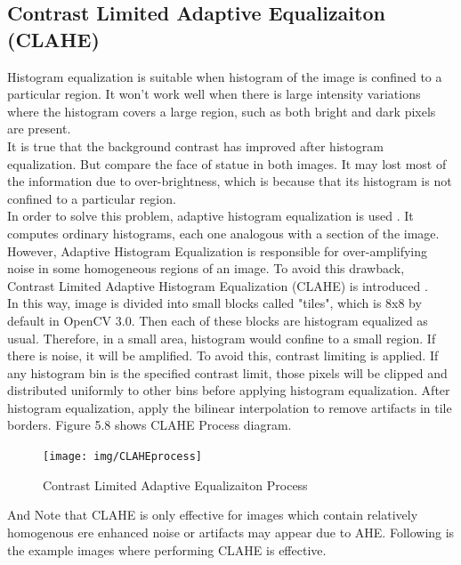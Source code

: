 \subsection{Contrast Limited Adaptive Equalizaiton (CLAHE)}
Histogram equalization is suitable when histogram of the image is confined to a particular region. It won't work well when there is large intensity variations where the histogram covers a large region, such as both bright and dark pixels are present. \\

It is true that the background contrast has improved after histogram equalization. But compare the face of statue in both images. It may lost most of the information due to over-brightness, which is because that its histogram is not confined to a particular region.\\

In order to solve this problem, adaptive histogram equalization is used \cite{Pizer}.  It computes ordinary histograms, each one analogous with a section of the image.  However, Adaptive Histogram Equalization is responsible for over-amplifying noise in some homogeneous regions of an image. To avoid this drawback, Contrast Limited
Adaptive Histogram Equalization (CLAHE) is introduced \cite{clahe}\cite{Stark}.\\

In this way, image is divided into small blocks called "tiles", which is 8x8 by default in OpenCV 3.0. Then each of these blocks are histogram equalized as usual. Therefore, in a small area, histogram would confine to a small region. If there is noise, it will be amplified. To avoid this, contrast limiting is applied. If any histogram bin is the specified contrast limit, those pixels will be clipped and distributed uniformly to other bins before applying histogram equalization. After histogram equalization, apply the bilinear interpolation to remove artifacts in tile borders. Figure 5.8 shows CLAHE Process diagram.\\
\begin{figure}[!htb]
	\centering
	\texttt{[image: img/CLAHEprocess]}
	\caption{ Contrast Limited Adaptive Equalizaiton Process}
\end{figure}

And Note that CLAHE is only effective for images which contain relatively homogenous ere enhanced noise or artifacts may appear due to AHE. Following is the example images where performing CLAHE is effective.

